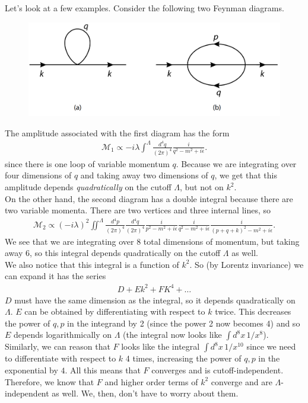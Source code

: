 \documentclass{book}
\theoremstyle{definition}
\newcommand{\f}[2]{\frac{#1}{#2}}
\begin{document}
Let's look at a few examples. Consider the following two Feynman diagrams.
\begin{figure}[!htb]
	\centering
	\includegraphics[scale=0.3]{mesons-phi-4}
\end{figure}

The amplitude associated with the first diagram has the form
\begin{align}
\mathcal{M}_1 \propto -i\lambda \int^\Lambda \f{d^4q}{(2\pi)^4}  \f{i}{q^2 - m^2 + i\epsilon}.
\end{align}
since there is one loop of variable momentum $q$. Because we are integrating over four dimensions of $q$ and taking away two dimensions of $q$, we get that this amplitude depends \textit{quadratically} on the cutoff $\Lambda$, but not on $k^2$. \\

On the other hand, the second diagram has a double integral because there are two variable momenta. There are two vertices and three internal lines, so
\begin{align}
\mathcal{M}_2 \propto (-i\lambda)^2 \iint^\Lambda \f{d^4p}{(2\pi)^4}\f{d^4q}{(2\pi)^4} \f{i}{p^2 - m^2 + i\epsilon} \f{i}{q^2 - m^2  + i\epsilon} \f{i}{(p+q+k)^2 - m^2  + i\epsilon}.
\end{align}
We see that we are integrating over 8 total dimensions of momentum, but taking away 6, so this integral depends quadratically on the cutoff $\Lambda$ as well. \\

We also notice that this integral is a function of $k^2$. So (by Lorentz invariance) we can expand it has the series
\begin{align}
D + Ek^2 + FK^4 + \dots
\end{align}
$D$ must have the same dimension as the integral, so it depends quadratically on $\Lambda$. $E$ can be obtained by differentiating with respect to $k$ twice. This decreases the power of $q,p$ in the integrand by 2 (since the power 2 now becomes 4) and so $E$ depends logarithmically on $\Lambda$ (the integral now looks like $\int d^8x\,1/x^8$). Similarly, we can reason that $F$ looks like the integral $\int d^8x\,1/x^10$ since we need to differentiate with respect to $k$ 4 times, increasing the power of $q,p$ in the exponential by $4$. All this means that $F$ converges and is cutoff-independent. Therefore, we know that $F$ and higher order terms of $k^2$ converge and are $\Lambda$-independent as well. We, then, don't have to worry about them.\\
\end{document}
